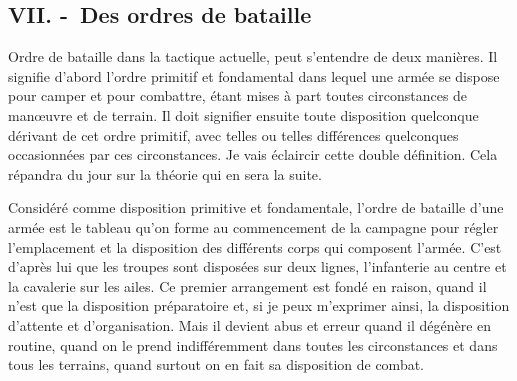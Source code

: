 \documentclass[french,twoside]{book} %
\begin{document}
\subsection[{VII. - Des ordres de bataille}]{VII. - Des ordres de bataille}
\noindent Ordre de bataille dans la tactique actuelle, peut s’entendre de deux manières. Il signifie d’abord l’ordre primitif et fondamental dans lequel une armée se dispose pour camper et pour combattre, étant mises à part toutes circonstances de manœuvre et de terrain. Il doit signifier ensuite toute disposition quelconque dérivant de cet ordre primitif, avec telles ou telles différences quelconques occasionnées par ces circonstances. Je vais éclaircir cette double définition. Cela répandra du jour sur la théorie qui en sera la suite.\par
Considéré comme disposition primitive et fondamentale, l’ordre de bataille d’une armée est le tableau qu’on forme au commencement de la campagne pour régler l’emplacement et la disposition des différents corps qui composent l’armée. C’est d’après lui que les troupes sont disposées sur deux lignes, l’infanterie au centre et la cavalerie sur les ailes. Ce premier arrangement est fondé en raison, quand il n’est que la disposition préparatoire et, si je peux m’exprimer ainsi, la disposition d’attente et d’organisation. Mais il devient abus et erreur quand il dégénère en routine, quand on le prend indifféremment dans toutes les circonstances et dans tous les terrains, quand surtout on en fait sa disposition de combat.\par
\end{document}
